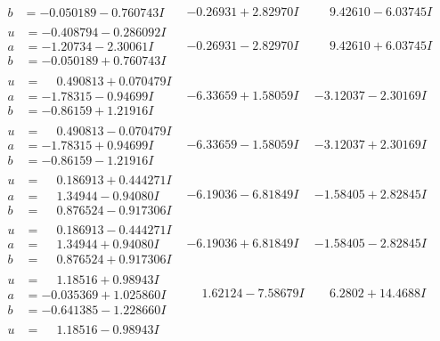 \documentclass[1p]{elsarticle_modified}
\theoremstyle{definition}
\begin{document}
$$\begin{array}{c|c|c}
\begin{aligned}
b &= -0.050189 - 0.760743 I\end{aligned}
 & -0.26931 + 2.82970 I & \phantom{-}9.42610 - 6.03745 I \\ \hline\begin{aligned}
u &= -0.408794 - 0.286092 I \\
a &= -1.20734 - 2.30061 I \\
b &= -0.050189 + 0.760743 I\end{aligned}
 & -0.26931 - 2.82970 I & \phantom{-}9.42610 + 6.03745 I \\ \hline\begin{aligned}
u &= \phantom{-}0.490813 + 0.070479 I \\
a &= -1.78315 - 0.94699 I \\
b &= -0.86159 + 1.21916 I\end{aligned}
 & -6.33659 + 1.58059 I & -3.12037 - 2.30169 I \\ \hline\begin{aligned}
u &= \phantom{-}0.490813 - 0.070479 I \\
a &= -1.78315 + 0.94699 I \\
b &= -0.86159 - 1.21916 I\end{aligned}
 & -6.33659 - 1.58059 I & -3.12037 + 2.30169 I \\ \hline\begin{aligned}
u &= \phantom{-}0.186913 + 0.444271 I \\
a &= \phantom{-}1.34944 - 0.94080 I \\
b &= \phantom{-}0.876524 - 0.917306 I\end{aligned}
 & -6.19036 - 6.81849 I & -1.58405 + 2.82845 I \\ \hline\begin{aligned}
u &= \phantom{-}0.186913 - 0.444271 I \\
a &= \phantom{-}1.34944 + 0.94080 I \\
b &= \phantom{-}0.876524 + 0.917306 I\end{aligned}
 & -6.19036 + 6.81849 I & -1.58405 - 2.82845 I \\ \hline\begin{aligned}
u &= \phantom{-}1.18516 + 0.98943 I \\
a &= -0.035369 + 1.025860 I \\
b &= -0.641385 - 1.228660 I\end{aligned}
 & \phantom{-}1.62124 - 7.58679 I & \phantom{-}6.2802 + 14.4688 I \\ \hline\begin{aligned}
u &= \phantom{-}1.18516 - 0.98943 I \\

\end{aligned}
\end{array}$$
\end{document}
